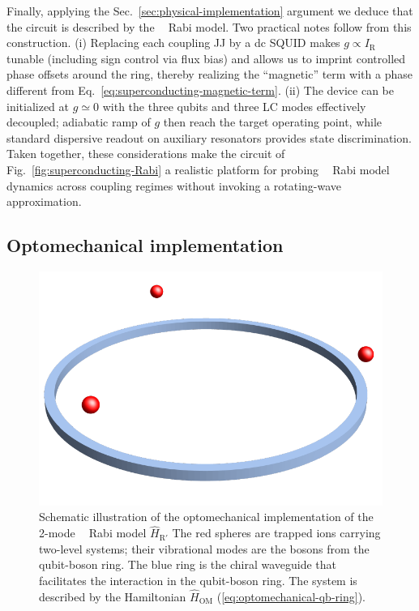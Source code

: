 \documentclass[reprint, aps, prx, amsmath, amssymb, longbibliography, superscriptaddress]{revtex4-2}
\DeclareMathOperator{\Zthree}{\mathbb{Z}_3}
\begin{document}
Finally, applying the Sec.~\ref{sec:physical-implementation} argument we deduce that the circuit is described by the $\Zthree$ Rabi model. Two practical notes follow from this construction. (i) Replacing each coupling JJ by a dc SQUID makes $g \propto I_{\mathrm{R}}$ tunable (including sign control via flux bias) and allows us to imprint controlled phase offsets around the ring, thereby realizing the ``magnetic'' term with a phase different from Eq.~\eqref{eq:superconducting-magnetic-term}. (ii) The device can be initialized at $g\simeq 0$ with the three qubits and three LC modes effectively decoupled; adiabatic ramp of $g$ then reach the target operating point, while standard dispersive readout on auxiliary resonators provides state discrimination. Taken together, these considerations make the circuit of Fig.~\ref{fig:superconducting-Rabi} a realistic platform for probing $\Zthree$ Rabi model dynamics across coupling regimes without invoking a rotating-wave approximation.


\subsection{Optomechanical implementation}
\label{sec:optomechanical-implementation}

\begin{figure}
    \includegraphics[width=0.8\linewidth]{pics/optomechanical_Rabi_pic.pdf}
    \caption{Schematic illustration of the optomechanical implementation of the 2-mode $\Zthree$ Rabi model $\hat H_{\text{R}'}$ \cite{sedov_chiral_2020} The red spheres are trapped ions carrying two-level systems; their vibrational modes are the bosons from the qubit-boson ring. The blue ring is the chiral waveguide that facilitates the interaction in the qubit-boson ring. The system is described by the Hamiltonian $\hat H_{\text{OM}}$ (\ref{eq:optomechanical-qb-ring}).}
    \label{fig:optomechanical-rabi}
\end{figure}
\end{document}
